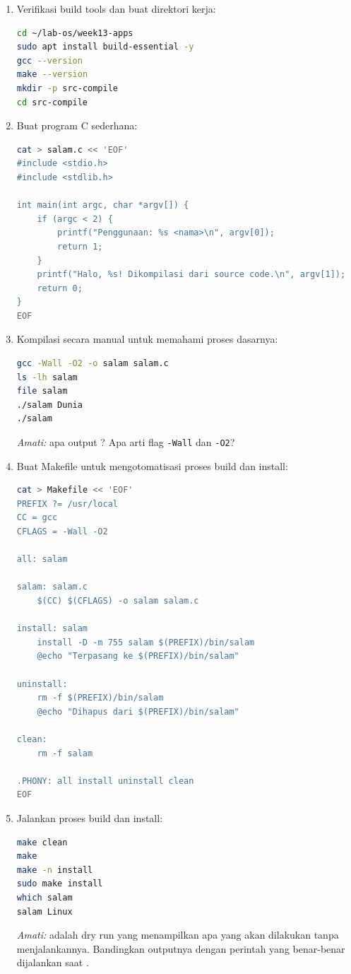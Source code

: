 \begin{enumerate}
    \item Verifikasi build tools dan buat direktori kerja:
\begin{lstlisting}[language=bash, caption={Persiapan lingkungan kompilasi}]
cd ~/lab-os/week13-apps
sudo apt install build-essential -y
gcc --version
make --version
mkdir -p src-compile
cd src-compile
\end{lstlisting}

    \item Buat program C sederhana:
\begin{lstlisting}[language=bash, caption={Membuat source code program C}]
cat > salam.c << 'EOF'
#include <stdio.h>
#include <stdlib.h>

int main(int argc, char *argv[]) {
    if (argc < 2) {
        printf("Penggunaan: %s <nama>\n", argv[0]);
        return 1;
    }
    printf("Halo, %s! Dikompilasi dari source code.\n", argv[1]);
    return 0;
}
EOF
\end{lstlisting}

    \item Kompilasi secara manual untuk memahami proses dasarnya:
\begin{lstlisting}[language=bash, caption={Kompilasi manual dengan gcc}]
gcc -Wall -O2 -o salam salam.c
ls -lh salam
file salam
./salam Dunia
./salam
\end{lstlisting}
    \textit{Amati:} apa output ? Apa arti flag \texttt{-Wall}
    dan \texttt{-O2}?

    \item Buat Makefile untuk mengotomatisasi proses build dan install:
\begin{lstlisting}[language=bash, caption={Membuat Makefile dengan target install dan uninstall}]
cat > Makefile << 'EOF'
PREFIX ?= /usr/local
CC = gcc
CFLAGS = -Wall -O2

all: salam

salam: salam.c
	$(CC) $(CFLAGS) -o salam salam.c

install: salam
	install -D -m 755 salam $(PREFIX)/bin/salam
	@echo "Terpasang ke $(PREFIX)/bin/salam"

uninstall:
	rm -f $(PREFIX)/bin/salam
	@echo "Dihapus dari $(PREFIX)/bin/salam"

clean:
	rm -f salam

.PHONY: all install uninstall clean
EOF
\end{lstlisting}

    \item Jalankan proses build dan install:
\begin{lstlisting}[language=bash, caption={Build dan install dengan Makefile}]
make clean
make
make -n install
sudo make install
which salam
salam Linux
\end{lstlisting}
    \textit{Amati:}  adalah dry run yang menampilkan apa yang
    akan dilakukan tanpa menjalankannya. Bandingkan outputnya dengan perintah
    yang benar-benar dijalankan saat .


\end{enumerate}

